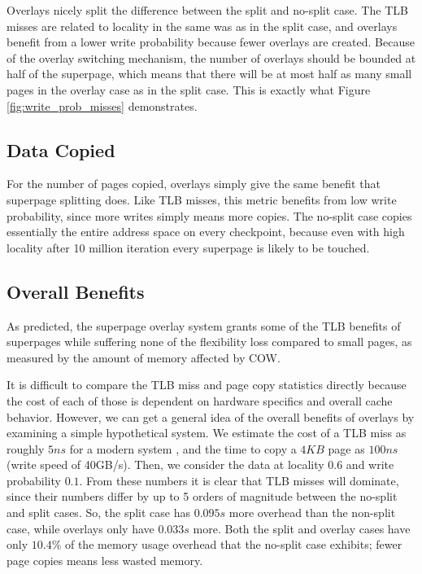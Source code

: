 Overlays nicely split the difference between the split and no-split case. The TLB misses are related to locality in the same was as in the split case, and overlays benefit from a lower write probability because fewer overlays are created. Because of the overlay switching mechanism, the number of overlays should be bounded at half of the superpage, which means that there will be at most half as many small pages in the overlay case as in the split case. This is exactly what Figure \ref{fig:write_prob_misses} demonstrates.

\subsection{Data Copied}
For the number of pages copied, overlays simply give the same benefit that superpage splitting does. Like TLB misses, this metric benefits from low write probability, since more writes simply means more copies. The no-split case copies essentially the entire address space on every checkpoint, because even with high locality after 10 million iteration every superpage is likely to be touched.

\subsection{Overall Benefits}
As predicted, the superpage overlay system grants some of the TLB benefits of superpages while suffering none of the flexibility loss compared to small pages, as measured by the amount of memory affected by COW.

It is difficult to compare the TLB miss and page copy statistics directly because the cost of each of those is dependent on hardware specifics and overall cache behavior. However, we can get a general idea of the overall benefits of overlays by examining a simple hypothetical system. We estimate the cost of a TLB miss as roughly $5ns$ for a modern system \cite{Gorman}, and the time to copy a $4KB$ page as $100ns$ (write speed of 40GB/s). Then, we consider the data at locality $0.6$ and write probability $0.1$. From these numbers it is clear that TLB misses will dominate, since their numbers differ by up to 5 orders of magnitude between the no-split and split cases. So, the split case has $0.095s$ more overhead than the non-split case, while overlays only have $0.033s$ more. Both the split and overlay cases have only $10.4\%$ of the memory usage overhead that the no-split case exhibits; fewer page copies means less wasted memory.

